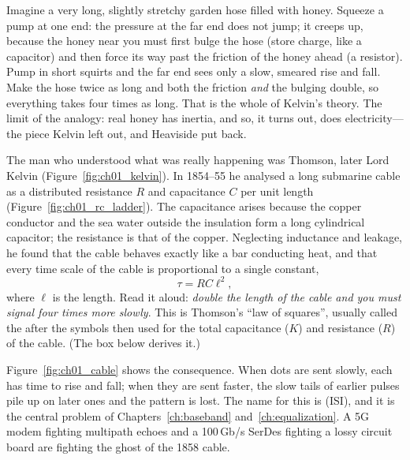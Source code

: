 
\begin{analogy}
Imagine a very long, slightly stretchy garden hose filled with honey. Squeeze a pump at one end: the
pressure at the far end does not jump; it creeps up, because the honey near you must first bulge the
hose (store charge, like a capacitor) and then force its way past the friction of the honey ahead (a
resistor). Pump in short squirts and the far end sees only a slow, smeared rise and fall. Make the
hose twice as long and both the friction \emph{and} the bulging double, so everything takes four
times as long. That is the whole of Kelvin's theory. The limit of the analogy: real honey has
inertia, and so, it turns out, does electricity---the piece Kelvin left out, and Heaviside put back.
\end{analogy}

The man who understood what was really happening was Thomson, later Lord Kelvin
(Figure~\ref{fig:ch01_kelvin}). In 1854--55 he
analysed a long submarine cable as a distributed resistance $R$ and capacitance $C$ per unit length
(Figure~\ref{fig:ch01_rc_ladder}).
The capacitance arises because the copper conductor and the sea water outside the insulation form a
long cylindrical capacitor; the resistance is that of the copper. Neglecting inductance and leakage,
he found that the cable behaves exactly like a bar conducting heat, and that every time scale of the
cable is proportional to a single constant,
\begin{equation}
\tau = RC\ell^2 ,
\label{eq:ch01:kr}
\end{equation}
where $\ell$ is the length. Read it aloud: \emph{double the length of the cable and you must signal
four times more slowly}. This is Thomson's ``law of squares'', usually called the  after
the symbols then used for the total capacitance ($K$) and resistance ($R$) of the cable. (The box
below derives it.)


Figure~\ref{fig:ch01_cable} shows the consequence. When dots are sent slowly, each has time to rise
and fall; when they are sent faster, the slow tails of earlier pulses pile up on later ones and the
pattern is lost. The name for this is  (ISI), and it is the central
problem of Chapters~\ref{ch:baseband} and~\ref{ch:equalization}. A 5G modem fighting multipath echoes
and a 100\,Gb/s SerDes fighting a lossy circuit board are fighting the ghost of the 1858 cable.

